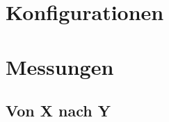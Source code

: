 \appendix

\section{Konfigurationen}
\label{appendix:configurations}





\section{Messungen}
\label{appendix:measures}
\subsection{Von X nach Y}




%  
% 

